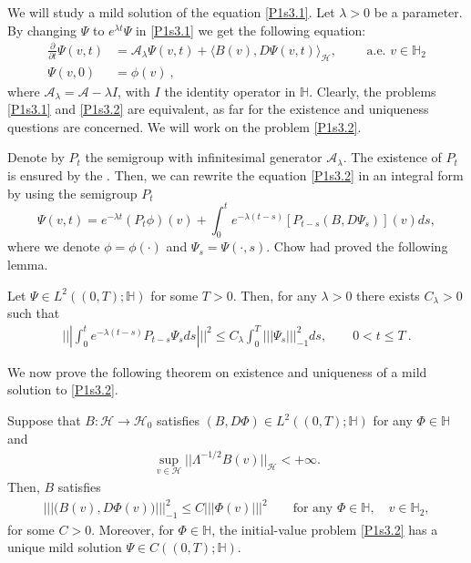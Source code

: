 \documentclass[review, onefignum, onetabnum]{siamart171218}
\begin{document}
We will study a mild solution of the equation \eqref{P1s3.1}. Let $\lambda>0$
be a parameter. By changing $\Psi$ to $e^{\lambda t}\Psi$ in
\eqref{P1s3.1} we get the following equation:
\begin{align*}
    \label{P1s3.2}
    \frac{\partial}{\partial t}\Psi(v,t)
        &= \mathcal{A}_\lambda\Psi(v,t)
        +
        \langle
            B(v),D\Psi(v,t)
        \rangle_\mathcal{H},
        \qquad \text{ a.e. }
        v \in \mathbb{H}_2
    \\
    \Psi(v,0)
        &= \phi(v) \ ,
\end{align*}
where $\mathcal{A}_\lambda=\mathcal{A}-\lambda I$, with $I$ the identity
operator in $\mathbb{H}$. Clearly, the problems \eqref{P1s3.1} and
\eqref{P1s3.2} are equivalent, as far for the existence and uniqueness
questions are concerned. We will work on the problem \eqref{P1s3.2}.

    Denote by $P_t$ the semigroup with infinitesimal generator
$\mathcal{A}_\lambda$. The existence of $P_t$ is ensured by the
.
Then, we can rewrite the equation \eqref{P1s3.2} in an integral form by using
the semigroup $P_t$
\begin{equation}
    \Psi(v,t)=
        e^{-\lambda t} (P_t\phi)(v)
        +
        \int_0^t  e^{-\lambda(t-s)}[P_{t-s}(B,D\Psi_s)](v) ds,
\end{equation}
where we denote $\phi=\phi(\cdot)$ and $\Psi_s=\Psi(\cdot,s)$.
Chow \cite{liu} had proved the following lemma.

\begin{lemma}\label{Lemma.s3.1}
    Let $\Psi\in L^2((0,T);\mathbb{H})$ for some $T>0$. Then, for any
    $\lambda>0$ there exists $C_\lambda>0$ such that
     \begin{align}
        |||\int_0^t e^{-\lambda (t-s)} P_{t-s} \Psi_{s} ds |||^2 \le C_\lambda
        \int_0^T |||\Psi_s|||_{-1}^2 ds,
        \qquad 0< t\le T
        \ .
        \label{s3.1.0}
     \end{align}
\end{lemma}

    We now prove the following theorem on existence and uniqueness of a mild
    solution to \eqref{P1s3.2}.
\begin{theorem}
    \label{Th-EU}
    Suppose that $B:\mathcal{H}\rightarrow \mathcal{H}_0$ satisfies
    $
        (B,D\Phi)\in
        L^2((0,T);\mathbb{H})
    $ for any $\Phi\in\mathbb{H}$ and
    \begin{align}
        \sup_{v\in \mathcal{H}} ||\Lambda^{-1/2}B(v)||_{\mathcal{H}}
            <+\infty.
    \end{align}
    Then, $B$ satisfies
    \begin{align}
        ||| \big(B(v),D\Phi(v) \big) |||_{-1}^2 \le C |||\Phi(v) |||^2  \qquad
        \mbox{for any } \Phi\in \mathbb{H},
        \quad v\in \mathbb{H}_2 ,
        \label{s3.1.1}
    \end{align}
    for some $C>0$.
    Moreover, for $\Phi\in \mathbb{H}$, the initial-value problem
    \eqref{P1s3.2} has a unique mild solution
    $\Psi\in C((0,T); \mathbb{H})$.
\end{theorem}
\end{document}
